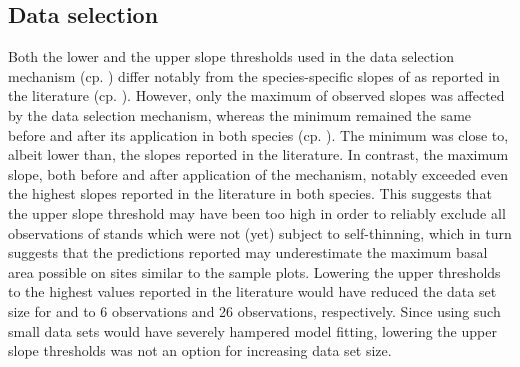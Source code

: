 \subsection{Data selection}

Both the lower and the upper slope thresholds used in the data selection mechanism (cp. ) differ notably from the species-specific slopes of  as reported in the literature (cp. ).  However, only the maximum of observed slopes was affected by the data selection mechanism, whereas the minimum remained the same before and after its application in both species (cp. ).  The minimum was close to, albeit lower than, the slopes reported in the literature.  In contrast, the maximum slope, both before and after application of the mechanism, notably exceeded even the highest slopes reported in the literature in both species.   This suggests that the upper slope threshold may have been too high in order to reliably exclude all observations of stands which were not (yet) subject to self-thinning, which in turn suggests that the predictions reported may underestimate the maximum basal area possible on sites similar to the sample plots.  Lowering the upper thresholds to the highest values reported in the literature would have reduced the data set size for \Beech{} and \Spruce{} to \num{6} observations and \num{26} observations, respectively.  Since using such small data sets would have severely hampered model fitting, lowering the upper slope thresholds was not an option for increasing data set size.

